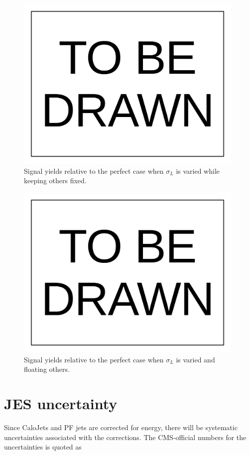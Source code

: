 \documentclass[10pt,a4paper,onecolumn]{	article}
\begin{document}
\begin{figure}
\includegraphics[width=110mm]{ToBeDrawn.pdf}
\caption{Signal yields relative to the perfect case when $\sigma_L$ is varied while keeping others fixed.}
\label{Figure_RelativeYieldChangingSigmaROnly}
\end{figure}

\begin{figure}
\includegraphics[width=110mm]{ToBeDrawn.pdf}
\caption{Signal yields relative to the perfect case when $\sigma_L$ is varied and floating others.}
\label{Figure_RelativeYieldChangingAlphaLFloatingOthers}
\end{figure}


\section{JES uncertainty}

Since CaloJets and PF jets are corrected for energy, there will be systematic uncertainties associated with the corrections.
The CMS-official numbers for the uncertainties is quoted as
\end{document}
